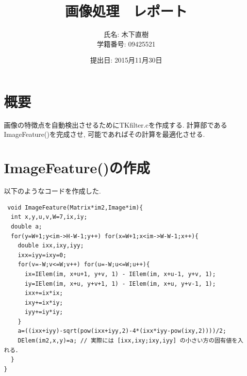 \documentclass[a4j]{jarticle}
\title{画像処理　レポート}
\author{氏名: 木下直樹\\学籍番号: 09425521}
\date{提出日: 2015月11月30日}
\begin{document}
\maketitle

\section{概要}
画像の特徴点を自動検出させるためにTKfilter.cを作成する.
計算部であるImageFeature()を完成させ, 可能であればその計算を最適化させる. 

\section{ImageFeature()の作成}
以下のようなコードを作成した.

\begin{verbatim}
 void ImageFeature(Matrix*im2,Image*im){
  int x,y,u,v,W=7,ix,iy;
  double a;
  for(y=W+1;y<im->H-W-1;y++) for(x=W+1;x<im->W-W-1;x++){
    double ixx,ixy,iyy;
    ixx=iyy=ixy=0;
    for(v=-W;v<=W;v++) for(u=-W;u<=W;u++){
      ix=IElem(im, x+u+1, y+v, 1) - IElem(im, x+u-1, y+v, 1);
      iy=IElem(im, x+u, y+v+1, 1) - IElem(im, x+u, y+v-1, 1);
      ixx+=ix*ix;
      ixy+=ix*iy;
      iyy+=iy*iy;
    }
    a=((ixx+iyy)-sqrt(pow(ixx+iyy,2)-4*(ixx*iyy-pow(ixy,2))))/2;
    DElem(im2,x,y)=a; // 実際には [ixx,ixy;ixy,iyy] の小さい方の固有値を入れる．
  }
}
\end{verbatim}
\end{document}
